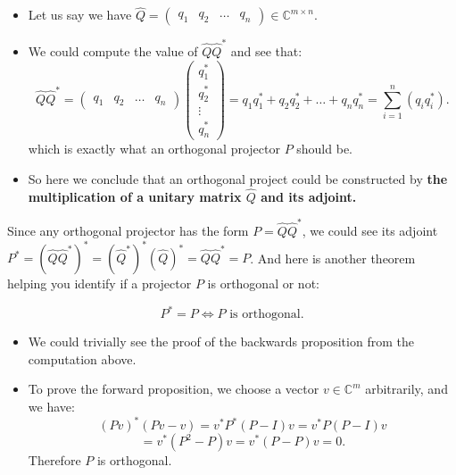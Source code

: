 \begin{itemize}
  \item Let us say we have $\hat{Q} = \begin{pmatrix} q_1 & q_2 & \ldots & q_n \end{pmatrix} \in \mathbb{C}^{m \times  n}$.
\item We could compute the value of $\hat{Q}\hat{Q}^{*}$ and see that:
  \[
    \hat{Q}\hat{Q}^* = \begin{pmatrix} q_1 & q_2 & \ldots & q_n \end{pmatrix} \begin{pmatrix} q_1^{*}\\ q_2^{*} \\\vdots\\ q_n^{*} \end{pmatrix} = q_1q_1^* + q_2q_2^* + \ldots + q_nq_n^{*} =  \sum_{i=1}^{n} (q_iq_i^{*})
  .\]
  which is exactly what an orthogonal projector \(P\) should be.
  \item So here we conclude that an orthogonal project could be constructed by \textbf{the multiplication of a unitary matrix \(\hat{Q}\) and its adjoint.}

\end{itemize}
Since any orthogonal projector has the form $P = \hat{Q}\hat{Q}^*$, we could see its adjoint $P^* = (\hat{Q}\hat{Q}^*)^* = (\hat{Q}^*)^*(\hat{Q})^* = \hat{Q}\hat{Q}^* = P$. And here is another theorem helping you identify if a projector \(P\) is orthogonal or not:
\begin{theorem}
  \[
    P^* = P \iff P  \text{ is orthogonal}
    .\]
\end{theorem}
\begin{itemize}
\item We could trivially see the proof of the backwards proposition from the computation above.
\item To prove the forward proposition, we choose a vector $v \in \mathbb{C}^{m}$ arbitrarily, and we have:
  \[
    (Pv)^{*}(Pv - v) = v^*P^*(P - I)v = v^*P(P - I)v 
  \]
  \[
  = v^*(P^2 - P)v = v^*(P - P)v = 0 
  .\] 
  Therefore $P$ is orthogonal.
\end{itemize}

